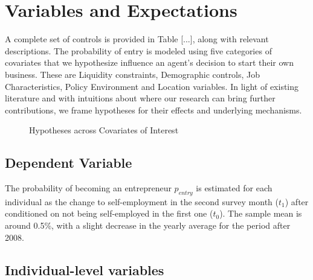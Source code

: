 \section{Variables and Expectations}

A complete set of controls is provided in Table [...], along with relevant descriptions. The probability of entry is modeled using five categories of covariates that we hypothesize influence an agent's decision to start their own business. These are Liquidity constraints, Demographic controls, Job Characteristics, Policy Environment and Location variables. In light of existing literature and with intuitions about where our research can bring further contributions, we frame hypotheses for their effects and underlying mechanisms.

\begin{figure}[hbtp]
        \caption{Hypotheses across Covariates of Interest}  
\end{figure}

\subsection{Dependent Variable}

The probability of becoming an entrepreneur $p_{entry}$ is estimated for each individual as the change to self-employment in the second survey month ($t_1$) after conditioned on not being self-employed in the first one ($t_0$). The sample mean is around 0.5\%, with a slight decrease in the yearly average for the period after 2008. 

\subsection{Individual-level variables}

